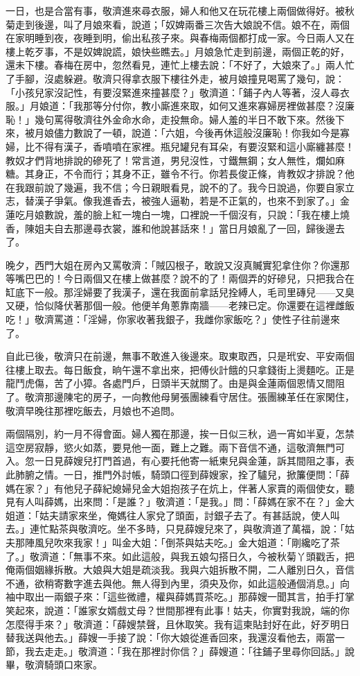 一日，也是合當有事，敬濟進來尋衣服，婦人和他又在玩花樓上兩個做得好。被秋菊走到後邊，叫了月娘來看，說道；「奴婢兩番三次告大娘說不信。娘不在，兩個在家明睡到夜，夜睡到明，偷出私孩子來。與春梅兩個都打成一家。今日兩人又在樓上乾歹事，不是奴婢說謊，娘快些瞧去。」月娘急忙走到前邊，兩個正乾的好，還未下樓。春梅在房中，忽然看見，連忙上樓去說：「不好了，大娘來了。」兩人忙了手腳，沒處躲避。敬濟只得拿衣服下樓往外走，被月娘撞見喝罵了幾句，說：「小孩兒家沒記性，有要沒緊進來撞甚麼？」敬濟道：「鋪子內人等著，沒人尋衣服。」月娘道：「我那等分付你，教小廝進來取，如何又進來寡婦房裡做甚麼？沒廉恥！」幾句罵得敬濟往外金命水命，走投無命。婦人羞的半日不敢下來。然後下來，被月娘儘力數說了一頓，說道：「六姐，今後再休這般沒廉恥！你我如今是寡婦，比不得有漢子，香噴噴在家裡。瓶兒罐兒有耳朵，有要沒緊和這小廝纏甚麼！教奴才們背地排說的磣死了！常言道，男兒沒性，寸鐵無鋼；女人無性，爛如麻糖。其身正，不令而行；其身不正，雖令不行。你若長俊正條，肯教奴才排說？他在我跟前說了幾遍，我不信；今日親眼看見，說不的了。我今日說過，你要自家立志，替漢子爭氣。像我進香去，被強人逼勒，若是不正氣的，也來不到家了。」金蓮吃月娘數說，羞的臉上紅一塊白一塊，口裡說一千個沒有，只說：「我在樓上燒香，陳姐夫自去那邊尋衣裳，誰和他說甚話來！」當日月娘亂了一回，歸後邊去了。

晚夕，西門大姐在房內又罵敬濟：「賊囚根子，敢說又沒真贓實犯拿住你？你還那等嘴巴巴的！今日兩個又在樓上做甚麼？說不的了！兩個弄的好磣兒，只把我合在缸底下一般。那淫婦要了我漢子，還在我面前拿話兒拴縛人，毛司里磚兒——又臭又硬，恰似降伏著那個一般。他便羊角蔥靠南牆——老辣已定。你還要在這裡雌飯吃！」敬濟罵道：「淫婦，你家收著我銀子，我雌你家飯吃？」使性子往前邊來了。

自此已後，敬濟只在前邊，無事不敢進入後邊來。取東取西，只是玳安、平安兩個往樓上取去。每日飯食，晌午還不拿出來，把傅伙計餓的只拿錢街上燙麵吃。正是龍鬥虎傷，苦了小獐。各處門戶，日頭半天就關了。由是與金蓮兩個恩情又間阻了。敬濟那邊陳宅的房子，一向教他母舅張團練看守居住。張團練革任在家閑住，敬濟早晚往那裡吃飯去，月娘也不追問。

兩個隔別，約一月不得會面。婦人獨在那邊，挨一日似三秋，過一宵如半夏，怎禁這空房寂靜，慾火如蒸，要見他一面，難上之難。兩下音信不通，這敬濟無門可入。忽一日見薛嫂兒打門首過，有心要托他寄一紙柬兒與金蓮，訴其間阻之事，表此肺腑之情。一日，推門外討帳，騎頭口徑到薛嫂家，拴了驢兒，掀簾便問：「薛媽在家？」有他兒子薛紀媳婦兒金大姐抱孩子在炕上，伴著人家賣的兩個使女，聽見有人叫薛媽，出來問：「是誰？」敬濟道：「是我。」問：「薛媽在家不在？」金大姐道：「姑夫請家來坐，俺媽往人家兌了頭面，討銀子去了。有甚話說，使人叫去。」連忙點茶與敬濟吃。坐不多時，只見薛嫂兒來了，與敬濟道了萬福，說：「姑夫那陣風兒吹來我家！」叫金大姐：「倒茶與姑夫吃。」金大姐道：「剛纔吃了茶了。」敬濟道：「無事不來。如此這般，與我五娘勾搭日久，今被秋菊丫頭戳舌，把俺兩個姻緣拆散。大娘與大姐是疏淡我。我與六姐拆散不開，二人離別日久，音信不通，欲稍寄數字進去與他。無人得到內里，須央及你，如此這般通個消息。」向袖中取出一兩銀子來：「這些微禮，權與薛媽買茶吃。」那薛嫂一聞其言，拍手打掌笑起來，說道：「誰家女婿戲丈母？世間那裡有此事！姑夫，你實對我說，端的你怎麼得手來？」敬濟道：「薛嫂禁聲，且休取笑。我有這柬貼封好在此，好歹明日替我送與他去。」薛嫂一手接了說：「你大娘從進香回來，我還沒看他去，兩當一節，我去走走。」敬濟道：「我在那裡討你信？」薛嫂道：「往鋪子里尋你回話。」說畢，敬濟騎頭口來家。

